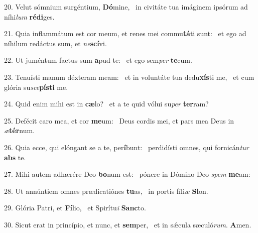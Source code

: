 20. Velut sómnium surgéntium, \textbf{Dó}mine, \ast\  in civitáte tua imáginem ipsórum ad níhi\textit{lum} \textbf{réd}\textbf{i}ges.\

21. Quia inflammátum est cor meum, et renes mei commu\textbf{tá}ti sunt: \ast\  et ego ad níhilum redáctus sum, et \textit{ne}\textbf{scí}vi.\

22. Ut juméntum factus sum \textbf{a}pud te: \ast\  et ego sem\textit{per} \textbf{te}cum.\

23. Tenuísti manum déxteram meam: \dag\  et in voluntáte tua dedu\textbf{xís}ti me, \ast\  et cum glória su\textit{sce}\textbf{pís}\textbf{ti} me.\

24. Quid enim mihi est in \textbf{cæ}lo? \ast\  et a te quid vólui su\textit{per} \textbf{ter}ram?\

25. Defécit caro mea, et cor \textbf{me}um: \ast\  Deus cordis mei, et pars mea Deus in \textit{æ}\textbf{tér}num.\

26. Quia ecce, qui elóngant se a te, per\textbf{í}bunt: \ast\  perdidísti omnes, qui fornicán\textit{tur} \textbf{abs} te.\

27. Mihi autem adhærére Deo \textbf{bo}num est: \ast\  pónere in Dómino Deo \textit{spem} \textbf{me}am:\

28. Ut annúntiem omnes prædicatiónes \textbf{tu}as, \ast\  in portis fíli\textit{æ} \textbf{Si}on.\

29. Glória Patri, et \textbf{Fí}lio, \ast\  et Spirítu\textit{i} \textbf{Sanc}to.\

30. Sicut erat in princípio, et nunc, et \textbf{sem}per, \ast\  et in sǽcula sæculó\textit{rum}. \textbf{A}men.\

